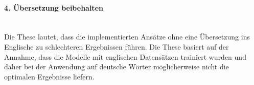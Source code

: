 \paragraph{4. Übersetzung beibehalten}\mbox{}\\
Die These lautet, dass die implementierten Ansätze ohne eine Übersetzung ins Englische zu schlechteren Ergebnissen führen. Die These basiert auf der Annahme, dass die Modelle mit englischen Datensätzen trainiert wurden und daher bei der Anwendung auf deutsche Wörter möglicherweise nicht die optimalen Ergebnisse liefern.\\

